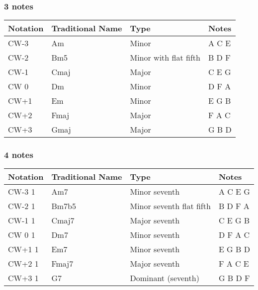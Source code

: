 \documentclass[]{report}
\begin{document}
\subsubsection*{3 notes}
\begin{table}[H]
\centering
\begin{tabularx}{\textwidth}{ll>{\raggedright\arraybackslash}Xl}
\toprule
Notation & Traditional Name & Type & Notes \\
\midrule
\textsf{CW-3} & Am & Minor & A C E \\
\textsf{CW-2} & Bm5 & Minor with flat fifth & B D F \\
\textsf{CW-1} & Cmaj & Major & C E G \\
\textsf{CW 0} & Dm & Minor & D F A \\
\textsf{CW+1} & Em & Minor & E G B \\
\textsf{CW+2} & Fmaj & Major & F A C \\
\textsf{CW+3} & Gmaj & Major & G B D \\
\bottomrule
\end{tabularx}
\end{table}
\subsubsection*{4 notes}
\begin{table}[H]
\centering
\begin{tabularx}{\textwidth}{ll>{\raggedright\arraybackslash}Xl}
\toprule
Notation & Traditional Name & Type & Notes \\
\midrule
\textsf{CW-3} 1 & Am7 & Minor seventh & A C E G \\
\textsf{CW-2} 1 & Bm7b5 & Minor seventh flat fifth & B D F A \\
\textsf{CW-1} 1 & Cmaj7 & Major seventh & C E G B \\
\textsf{CW 0} 1 & Dm7 & Minor seventh & D F A C \\
\textsf{CW+1} 1 & Em7 & Minor seventh & E G B D \\
\textsf{CW+2} 1 & Fmaj7 & Major seventh & F A C E \\
\textsf{CW+3} 1 & G7 & Dominant (seventh) & G B D F \\
\bottomrule
\end{tabularx}
\end{table}
\end{document}

